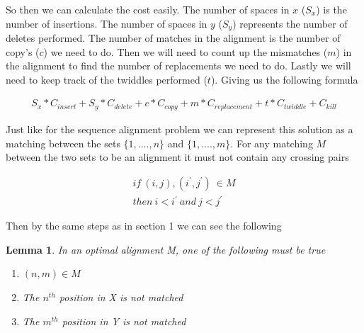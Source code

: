 \documentclass{article}
\newtheorem{lemma}{Lemma}[thm]
\begin{document}
					So then we can calculate the cost easily. The number of spaces in $x$ ($S_x$) is the number of insertions. The number of spaces in $y$ ($S_y$) represents the number of deletes performed. The number of matches in the alignment is the number of copy's ($c$) we need to do. Then we will need to count up the mismatches ($m$) in the alignment to find the number of replacements we need to do. Lastly we will need to keep track of the twiddles performed ($t$). Giving us the following formula
					
					\begin{align}
						S_x*C_{insert} + S_y*C_{delete} + c*C_{copy} + m*C_{replacement} + t*C_{twiddle} + C_{kill}
					\end{align}
				
					Just like for the sequence alignment problem we can represent this solution as a matching between the sets $\{1,....,n\}$ and $\{1,....,m\}$. For any matching $M$ between the two sets to be an alignment it must not contain any crossing pairs
  		
		\begin{align*}
  			if\ (i,j),(i^\prime, j^\prime)\  \in M\\
  			then\ i < i^\prime\ and\ j < j^\prime
  		\end{align*} 
					
					Then by the same steps as in section 1 we can see the following
					
					\begin{lemma}
						In an optimal alignment M, one of the following must be true
			
						\begin{enumerate}
							\item $(n,m) \in M$
							\item The $n^{th}$ position in X is not matched
							\item The $m^{th}$ position in Y is not matched
						\end{enumerate}
					\end{lemma}
					
\end{document}
